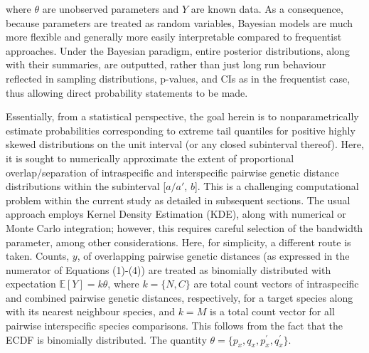 \documentclass[12pt]{article}
\begin{document}
\noindent where $\theta$ are unobserved parameters and $Y$ are known data.  As a consequence, because parameters are treated as random variables, Bayesian models are much more flexible and generally more easily interpretable compared to frequentist approaches. Under the Bayesian paradigm, entire posterior distributions, along with their summaries, are outputted, rather than just long run behaviour reflected in sampling distributions, p-values, and CIs as in the frequentist case, thus allowing direct probability statements to be made. 

Essentially, from a statistical perspective, the goal herein is to nonparametrically estimate probabilities corresponding to extreme tail quantiles for positive highly skewed distributions on the unit interval  (or any closed subinterval thereof). Here, it is sought to numerically approximate the extent of proportional overlap/separation of intraspecific and interspecific pairwise genetic distance distributions within the subinterval [$a/a'$, $b$]. This is a challenging computational problem within the current study as detailed in subsequent sections. The usual approach employs Kernel Density Estimation (KDE), along with numerical or Monte Carlo integration; however, this requires careful selection of the bandwidth parameter, among other considerations. Here, for simplicity, a different route is taken. Counts, $y$, of overlapping pairwise genetic distances (as expressed in the numerator of Equations (1)-(4)) are treated as binomially distributed with expectation $\mathbb{E}[Y] = k\theta$, where $k = \{N, C\}$ are total count vectors of intraspecific and combined pairwise genetic distances, respectively, for a target species along with its nearest neighbour species, and $k = M$ is a total count vector for all pairwise interspecific species comparisons. This follows from the fact that the ECDF is binomially distributed. The quantity $\theta = \{p_x, q_x, p^{'}_x, q^{'}_x\}$. 
\end{document}
